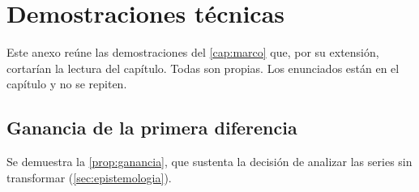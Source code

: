 
\chapter{Demostraciones técnicas}
\label{ap:demostraciones}

Este anexo reúne las demostraciones del \cref{cap:marco} que, por su extensión, cortarían la
lectura del capítulo. Todas son propias. Los enunciados están en el capítulo y no se repiten.

\section{Ganancia de la primera diferencia}
\label{ap:dem-ganancia}

Se demuestra la \cref{prop:ganancia}, que sustenta la decisión de analizar las series sin
transformar (\cref{sec:epistemologia}).

